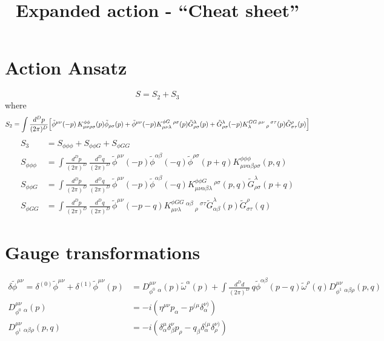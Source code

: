 \documentclass[11pt, oneside]{article}   	%
\title{Expanded action - ``Cheat sheet''}
\author{}
\newcommand{\pmeas}[1][p]{\frac{d^{D}#1}{(2\pi)^{D}}\,}
\newcommand{\p}{\tilde{\phi}}
\newcommand{\G}{\tilde{G}}
\newcommand{\tomega}{\tilde{\omega}}
\begin{document}
\maketitle
\section{Action Ansatz}
\begin{equation} 
S = S_2 + S_3 
 \end{equation}
 where
 \begin{equation} 
\begin{aligned}S_2 = \int\frac{d^D p}{(2\pi)^D}\Bigl[
    \p^{\mu\nu}(-p)\,K^{\phi\phi}_{\mu\nu\rho\sigma}(p)\p_{\rho\sigma}(p) + \p^{\mu\nu}(-p)K^{\phi G}_{\mu\nu\lambda}\,^{\rho\sigma}(p) \G^\lambda _{\rho\sigma}(p)+ \G^\lambda _{\rho\sigma}(-p)K^{G G}_{\lambda}\,^{\mu\nu}\,_{\rho}\,^{\sigma\tau}(p) \G^\rho _{\sigma\tau}(p) \Bigr]
\end{aligned}\end{equation}
\hfill \break
\begin{equation} \begin{aligned} 
S_3 &= S_{\phi\phi\phi} + S_{\phi\phi G} + S_{\phi G G} \\
S_{\phi\phi\phi}  &= \int \pmeas \pmeas[q] \p^{\mu\nu} (-p) \p^{\alpha \beta} (-q) \p^{\rho\sigma} (p+q) K^{\phi\phi\phi}_{\mu\nu\alpha\beta\rho\sigma} (p,q) \\
S_{\phi\phi G} &= \int \pmeas \pmeas[q] \p^{\mu\nu} (-p) \p^{\alpha\beta}(-q) K^{\phi\phi G}_{\mu\nu\alpha\beta\lambda}\,^{\rho\sigma} (p,q) \G^\lambda _{\rho\sigma} (p+q)\\
S_{\phi G G}&= \int \pmeas \pmeas[q] \p^{\mu\nu} (-p-q) K^{\phi G G}_{\mu\nu\lambda}\,^{\alpha\beta}\,_{\rho}\,^{\sigma\tau} \G^\lambda _{\alpha\beta} (p) \G^\rho _{\sigma \tau} (q)
 \end{aligned} \end{equation}



\section{Gauge transformations}
\begin{equation} 
\begin{aligned} 
\delta \p^{\mu\nu} = \delta^{(0)}\p^{\mu\nu} + \delta^{(1)}\p^{\mu\nu}(p) &= D_{\phi^0}^{\mu\nu}\,_{\alpha} (p)\tomega^\alpha (p) + \int \pmeas[d]{q} \p^{\alpha\beta}(p-q)\tomega^\rho (q) D_{\phi^1}^{\mu\nu}\,_{\alpha\beta\rho}(p,q) \\ 
D_{\phi^0}^{\mu\nu}\,_{\alpha} (p) &= -i(\eta^{\mu\nu}p_\alpha - p^{(\mu}\delta^{\nu)}_{\alpha}) \\  
D_{\phi^1}^{\mu\nu}\,_{\alpha\beta\rho}(p,q) &= -i (\delta^{\mu}_\alpha \delta^\nu _\beta p_\rho - q_\beta \delta^{(\mu}_\alpha \delta^{\nu)}_\rho)
\end{aligned} 
\end{equation}
\end{document}
